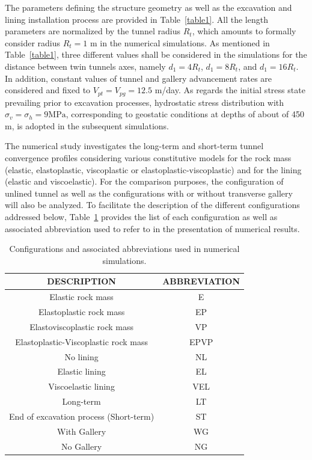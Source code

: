\documentclass[Journal,letterpaper, NoLists,SectionNumbers]{ascelike-new}
\begin{document}
The parameters defining the structure geometry as well as the excavation and lining installation process are provided in Table~\ref{table1}. All the length parameters are normalized by the tunnel radius $R_t$, which amounts to formally consider radius $R_t=1$ m in the numerical simulations. As mentioned in Table~\ref{table1}, three different values shall be considered in the simulations for the distance between twin tunnels axes, namely $d_1=4R_t$, $d_1=8R_t$, and $d_1=16R_t$. In addition, constant values of tunnel and gallery advancement rates are considered and fixed to $V_{pt} = V_{pg} = 12.5$ m/day. As regards the initial stress state prevailing prior to excavation processes, hydrostatic stress distribution with $\sigma_v=\sigma_h=9 \text{MPa}$, corresponding to geostatic conditions at depths of about of 450 m, is adopted in the subsequent simulations.

The numerical study investigates the long-term and short-term tunnel convergence profiles considering various constitutive models for the rock mass (elastic, elastoplastic, viscoplastic or elastoplastic-viscoplastic) and for the lining (elastic and viscoelastic). For the comparison purposes, the configuration of unlined tunnel as well as the configurations with or without transverse gallery will also be analyzed. To facilitate the description of the different configurations addressed below, Table~\ref{table3} provides the list of each configuration as well as associated abbreviation used to refer to in the presentation of numerical results.

\begin{table}[h!]
	\caption{Configurations and associated abbreviations used in numerical simulations.}
	\label{table3}
	\centering
	\renewcommand{\arraystretch}{1.25}
	\begin{tabular}{c c}
		\hline
		\multicolumn{1}{c}{DESCRIPTION} &
		\multicolumn{1}{c}{ABBREVIATION} \\
		\hline
		Elastic rock mass & E \\
		Elastoplastic rock mass & EP \\
		Elastoviscoplastic rock mass & VP \\
		Elastoplastic-Viscoplastic rock mass & EPVP \\
		No lining & NL \\
		Elastic lining & EL \\
		Viscoelastic lining & VEL \\
		Long-term & LT \\
		End of excavation process (Short-term) & ST \\
		With Gallery & WG \\
		No Gallery & NG \\			
		\hline
	\end{tabular}
	\normalsize
\end{table}
\end{document}
